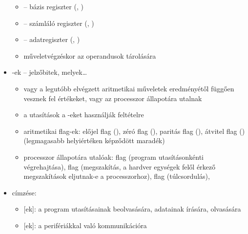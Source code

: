 \documentclass[../main.tex]{subfiles}
\begin{document}
\begin{itemize}
\begin{itemize}
          \item {} – bázis regiszter
                (, )

          \item {} – számláló regiszter
                (, )

          \item {} – adatregiszter
                (, )

          \item műveletvégzéskor az operandusok tárolására
        \end{itemize}

  \item {}-ek – jelzőbitek, melyek\dots
        \begin{itemize}
          \item vagy a legutóbb elvégzett aritmetikai
                műveletek eredményétől függően vesznek fel értékeket,
                vagy az processzor állapotára utalnak

          \item a  utasítások
                a -eket használják feltételre

          \item aritmetikai flag-ek:
                előjel flag (),
                zéró flag (),
                paritás flag (),
                átvitel flag ()
                (legmagasabb helyiértéken képződött maradék)

          \item processzor állapotára utalóak:
                 flag (program utasításonkénti végrehajtása),
                 flag (megszakítás,
                a hardver egységek felől érkező megszakítások
                eljutnak-e a processzorhoz),
                 flag (túlcsordulás),
        \end{itemize}

  \item {} címzése:
        \begin{itemize}
          \item {}[ek]:
                a program utasításainak beolvasására,
                adatainak írására, olvasására

          \item {}[ek]:
                a perifériákkal való kommunikációra
        \end{itemize}


\end{itemize}
\end{document}
